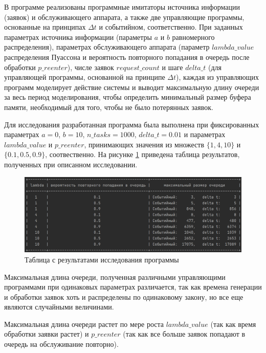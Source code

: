 \documentclass[14pt, a4paper]{extarticle}
\begin{document}
В программе реализованы программные имитаторы источника информации (заявок) и обслуживающего аппарата, а также две управляющие программы, основанные на принципах $\Delta t$ и событийном, соответственно. При заданных параметрах источника информации (параметры $a$ и $b$ равномерного распределения), параметрах обслуживающего аппарата (параметр $lambda\_value$ распределения Пуассона и вероятность повторного попадания в очередь после обработки $p\_reenter$), числе заявок $request\_count$ и шаге $delta\_t$ (для управляющей программы, основанной на принципе $\Delta t$), каждая из управляющих программ моделирует действие системы и выводит максимальную длину очереди за весь период моделирования, чтобы определить минимальный размер буфера памяти, необходимый для того, чтобы не было потерянных заявок.

Для исследования разработанная программа была выполнена при фиксированных параметрах $a=0$, $b=10$, $n\_tasks=1000$, $delta\_t=0.01$ и параметрах $lambda\_value$ и $p\_reenter$, принимающих значения из множеств $\{1, 4, 10\}$ и  $\{0.1, 0.5, 0.9\}$, соотвественно. На рисунке \ref{pic:1} приведена таблица результатов, полученных при описанном исследовании.


\newpage
\begin{figure}[h]
	\begin{center}
		{\includegraphics[scale=0.85]{pictures/1.png}
			\caption{Таблица с результатами исследования программы}
			\label{pic:1}}
	\end{center}
\end{figure}

Максимальная длина очереди, полученная различными управляющими программами при одинаковых параметрах различается, так как времена генерации и обработки заявок хоть и распределены по одинаковому закону, но все еще являются случайными величинами.

Максимальная длина очереди растет по мере роста $lambda\_value$ (так как время обработки заявки растет) и $p\_reenter$ (так как все больше заявок попадают в очередь на обслуживание повторно).
\end{document}
